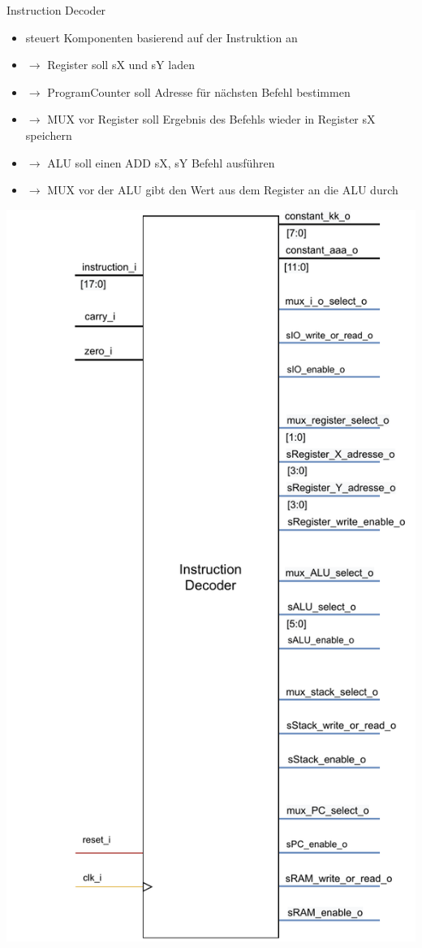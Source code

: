 \documentclass[10pt, t,
aspectratio=169,%
usenames,
dvipsnames,
]{beamer}
\begin{document}
	\begin{frame}{Instruction Decoder}
		\begin{multicols}{2}
		\begin{itemize}
			\item steuert Komponenten basierend auf der Instruktion an
			\item $\rightarrow$ Register soll sX und sY laden
			\item $\rightarrow$ ProgramCounter soll Adresse für nächsten Befehl bestimmen
			\item $\rightarrow$ MUX vor Register soll Ergebnis des Befehls wieder in Register sX speichern
			\item $\rightarrow$ ALU soll einen ADD sX, sY Befehl ausführen
			\item $\rightarrow$ MUX vor der ALU gibt den Wert aus dem Register an die ALU durch
		\end{itemize}
		\includegraphics[width=.55\linewidth]{../Blockbeschreibungen/ID_beschreibung.pdf}
		\end{multicols}
	\end{frame}
\end{document}
